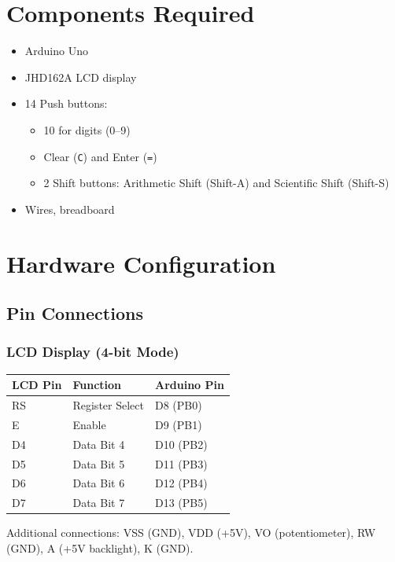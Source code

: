 \documentclass{article}
\theoremstyle{remark}
\begin{document}
\section{Components Required}
\begin{itemize}[noitemsep]
    \item Arduino Uno
    \item JHD162A LCD display
    \item 14 Push buttons:
    \begin{itemize}[noitemsep]
        \item 10 for digits (0--9)
        \item Clear (\texttt{C}) and Enter (\texttt{=})
        \item 2 Shift buttons: Arithmetic Shift (Shift-A) and Scientific Shift (Shift-S)
    \end{itemize}
    \item Wires, breadboard
\end{itemize}

\section{Hardware Configuration}
\subsection{Pin Connections}
\subsubsection{LCD Display (4-bit Mode)}
\begin{center}
\begin{tabular}{|l|l|l|}
\hline
\textbf{LCD Pin} & \textbf{Function} & \textbf{Arduino Pin} \\ \hline
RS             & Register Select & D8 (PB0) \\ \hline
E              & Enable          & D9 (PB1) \\ \hline
D4             & Data Bit 4      & D10 (PB2) \\ \hline
D5             & Data Bit 5      & D11 (PB3) \\ \hline
D6             & Data Bit 6      & D12 (PB4) \\ \hline
D7             & Data Bit 7      & D13 (PB5) \\ \hline
\end{tabular}
\end{center}
Additional connections: VSS (GND), VDD (+5V), VO (potentiometer), RW (GND), A (+5V backlight), K (GND).
\end{document}
